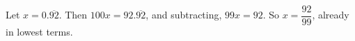 Let $x=0.\overline{92}$. Then $100x=92.\overline{92}$, and subtracting, $99x=92$. So $x=\boxed{\dfrac{92}{99}}$, already in lowest terms.
